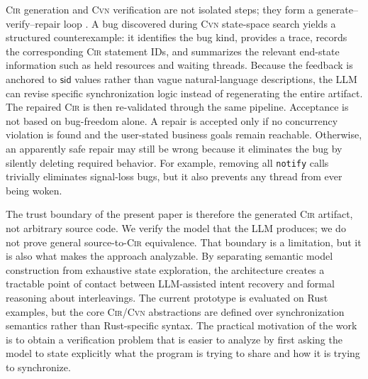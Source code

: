 \textsc{Cir} generation and \textsc{Cvn} verification are not isolated steps; they form a generate--verify--repair loop \cite{Clarke2000CEGAR,Fan2023RepairFromLLMs,Bouzenia2025RepairAgent}. A bug discovered during \textsc{Cvn} state-space search yields a structured counterexample: it identifies the bug kind, provides a trace, records the corresponding \textsc{Cir} statement IDs, and summarizes the relevant end-state information such as held resources and waiting threads. Because the feedback is anchored to $\mathsf{sid}$ values rather than vague natural-language descriptions, the LLM can revise specific synchronization logic instead of regenerating the entire artifact. The repaired \textsc{Cir} is then re-validated through the same pipeline. Acceptance is not based on bug-freedom alone. A repair is accepted only if no concurrency violation is found and the user-stated business goals remain reachable. Otherwise, an apparently safe repair may still be wrong because it eliminates the bug by silently deleting required behavior. For example, removing all \texttt{notify} calls trivially eliminates signal-loss bugs, but it also prevents any thread from ever being woken.

The trust boundary of the present paper is therefore the generated \textsc{Cir} artifact, not arbitrary source code. We verify the model that the LLM produces; we do not prove general source-to-\textsc{Cir} equivalence. That boundary is a limitation, but it is also what makes the approach analyzable. By separating semantic model construction from exhaustive state exploration, the architecture creates a tractable point of contact between LLM-assisted intent recovery and formal reasoning about interleavings. The current prototype is evaluated on Rust examples, but the core \textsc{Cir}/\textsc{Cvn} abstractions are defined over synchronization semantics rather than Rust-specific syntax. The practical motivation of the work is to obtain a verification problem that is easier to analyze by first asking the model to state explicitly what the program is trying to share and how it is trying to synchronize.

